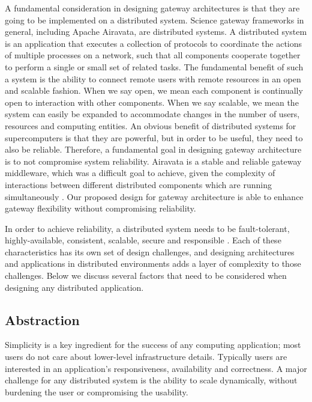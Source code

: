 \documentclass[sigconf]{acmart}
\begin{document}
A fundamental consideration in designing gateway architectures is that they are going to be implemented on a distributed system.  Science gateway frameworks in general, including Apache Airavata, are distributed systems.  A distributed system is an application that executes a collection of protocols to coordinate the actions of multiple processes on a network, such that all components cooperate together to perform a single or small set of related tasks. The fundamental benefit of such a system is the ability to connect remote users with remote resources in an open and scalable fashion. When we say open, we mean each component is continually open to interaction with other components. When we say scalable, we mean the system can easily be expanded to accommodate changes in the number of users, resources and computing entities. An obvious benefit of distributed systems for supercomputers is that they are powerful, but in order to be useful, they need to also be reliable.  Therefore, a fundamental goal in designing gateway architecture is to not compromise system reliability.  Airavata is a stable and reliable gateway middleware, which was a difficult goal to achieve, given the complexity of interactions between different distributed components which are running simultaneously \cite{pierce2015apache}. Our proposed design for gateway architecture is able to enhance gateway flexibility without compromising reliability.

In order to achieve reliability, a distributed system needs to be fault-tolerant, highly-available, consistent, scalable, secure and responsible \cite{burns2016design, casavant1988taxonomy}. Each of these characteristics has its own set of design challenges, and designing architectures and applications in distributed environments adds a layer of complexity to those challenges.  Below we discuss several factors that need to be considered when designing any distributed application.

\subsection{Abstraction}
Simplicity is a key ingredient for the success of any computing application; most users do not care about lower-level infrastructure details. Typically users are interested in an application's responsiveness, availability and correctness. A major challenge for any distributed system is the ability to scale dynamically, without burdening the user or compromising the usability. 
\end{document}
